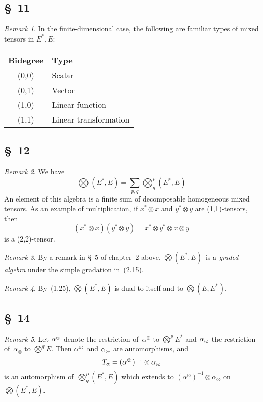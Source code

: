 \documentclass[letterpaper,12pt]{article}
\newcommand{\tprod}{\otimes}
\newcommand{\bigtprod}{\bigotimes}
\newcommand{\medtprod}{{\textstyle\bigtprod}}
\newcommand{\circled}[1]{\text{\tiny\textcircled{\textit{#1}}}}
\theoremstyle{definition}
\theoremstyle{remark}
\newtheorem*{rmk}{Remark}
\begin{document}
\subsection*{\S~11}
\begin{rmk}
In the finite-dimensional case, the following are familiar types of mixed tensors in \(E^*,E\):
\begin{center}
\begin{tabular}{|c|l|}
\hline
\textbf{Bidegree}&\textbf{Type}\\
\hline
(0,0)&Scalar\\
(0,1)&Vector\\
(1,0)&Linear function\\
(1,1)&Linear transformation\\
\hline
\end{tabular}
\end{center}
\end{rmk}

\subsection*{\S~12}
\begin{rmk}
We have
\[\medtprod(E^*,E)=\sum_{p,q}\medtprod^p_q(E^*,E)\]
An element of this algebra is a finite sum of decomposable homogeneous mixed tensors. As an example of multiplication, if \(x^*\tprod x\) and \(y^*\tprod y\) are (1,1)-tensors, then
\[(x^*\tprod x)(y^*\tprod y)=x^*\tprod y^*\tprod x\tprod y\]
is a (2,2)-tensor.
\end{rmk}

\begin{rmk}
By a remark in \S~5 of chapter~2 above, \(\medtprod(E^*,E)\)~is a \emph{graded algebra} under the simple gradation in~(2.15).
\end{rmk}

\begin{rmk}
By~(1.25), \(\medtprod(E^*,E)\) is dual to itself and to \(\medtprod(E,E^*)\).
\end{rmk}

\subsection*{\S~14}
\begin{rmk}
Let \(\alpha^{\circled{p}}\) denote the restriction of~\(\alpha^{\tprod}\) to \(\medtprod^p E^*\) and \(\alpha_{\circled{q}}\) the restriction of~\(\alpha_{\tprod}\) to \(\medtprod^q E\). Then \(\alpha^{\circled{p}}\) and \(\alpha_{\circled{q}}\) are automorphisms, and
\[T_{\alpha}=(\alpha^{\circled{p}})^{-1}\tprod\alpha_{\circled{q}}\]
is an automorphism of~\(\medtprod^p_q(E^*,E)\) which extends to \((\alpha^{\tprod})^{-1}\tprod\alpha_{\tprod}\) on~\(\medtprod(E^*,E)\).
\end{rmk}
\end{document}
